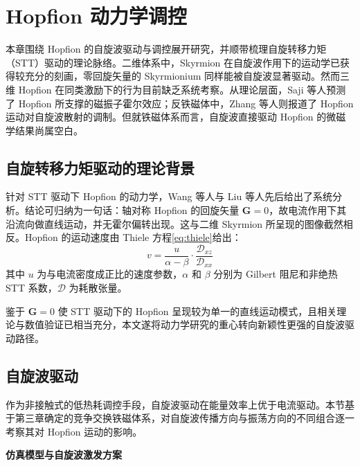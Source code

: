 \chapter{Hopfion 动力学调控}

本章围绕 Hopfion 的自旋波驱动与调控展开研究，并顺带梳理自旋转移力矩（STT）驱动的理论脉络。二维体系中，Skyrmion 在自旋波作用下的运动学已获得较充分的刻画\cite{ding2015motion,huang2023transient}，零回旋矢量的 Skyrmionium 同样能被自旋波显著驱动\cite{shen2018skyrmionium}。然而三维 Hopfion 在同类激励下的行为目前缺乏系统考察。从理论层面，Saji 等人预测了 Hopfion 所支撑的磁振子霍尔效应\cite{saji2023magnonic}；反铁磁体中，Zhang 等人则报道了 Hopfion 运动对自旋波散射的调制\cite{zhang2023magnon}。但就铁磁体系而言，自旋波直接驱动 Hopfion 的微磁学结果尚属空白。


\section{自旋转移力矩驱动的理论背景}

针对 STT 驱动下 Hopfion 的动力学，Wang 等人\cite{wang2019current}与 Liu 等人\cite{liu2020three}先后给出了系统分析。结论可归纳为一句话：轴对称 Hopfion 的回旋矢量 $\mathbf{G} = 0$，故电流作用下其沿流向做直线运动，并无霍尔偏转出现。这与二维 Skyrmion 所呈现的图像截然相反。Hopfion 的运动速度由 Thiele 方程\cref{eq:thiele}给出：
\begin{equation}
  v = \frac{u}{\alpha - \beta} \cdot \frac{\mathcal{D}_{xz}}{\mathcal{D}_{xx}}
  \label{eq:hopfion-stt-velocity}
\end{equation}
其中 $u$ 为与电流密度成正比的速度参数，$\alpha$ 和 $\beta$ 分别为 Gilbert 阻尼和非绝热 STT 系数，$\mathcal{D}$ 为耗散张量。

鉴于 $\mathbf{G} = 0$ 使 STT 驱动下的 Hopfion 呈现较为单一的直线运动模式，且相关理论与数值验证已相当充分\cite{wang2019current,liu2020three}，本文遂将动力学研究的重心转向新颖性更强的自旋波驱动路径。


\section{自旋波驱动}

作为非接触式的低热耗调控手段，自旋波驱动在能量效率上优于电流驱动。本节基于第三章确定的竞争交换铁磁体系，对自旋波传播方向与振荡方向的不同组合逐一考察其对 Hopfion 运动的影响。

\par\noindent\textbf{仿真模型与自旋波激发方案}\par\nobreak

